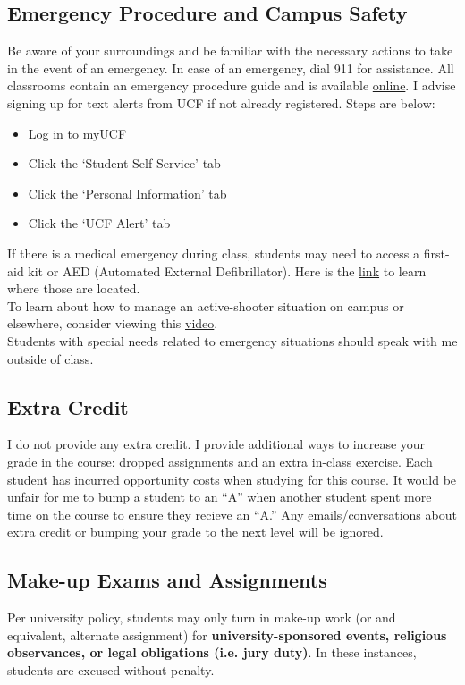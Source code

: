 \documentclass[11pt]{paper}
\begin{document}
\subsection{Emergency Procedure and Campus Safety}
Be aware of your surroundings and be familiar with the necessary actions to take in the event of an emergency. In case of an emergency, dial 911 for assistance. All classrooms contain an emergency procedure guide and is available \href{http://emergency.ucf.edu/emergency_guide.html}{online}. I advise signing up for text alerts from UCF if not already registered. Steps are below:
\begin{itemize}
	\item Log in to myUCF
	\item Click the `Student Self Service' tab
	\item Click the `Personal Information' tab
	\item Click the `UCF Alert' tab
\end{itemize} 

If there is a medical emergency during class, students may need to access a
first-aid kit or AED (Automated External Defibrillator). Here is the \href{http://www.ehs.ucf.edu/AEDlocations-UCF}{link} to learn where those are located.\\

To learn about how to manage an active-shooter situation on campus or elsewhere, consider viewing this \href{https://www.youtube.com/watch?v=NIKYajEx4pk&feature=youtu.be}{video}.\\

Students with special needs related to emergency situations should speak with me outside of class.
\subsection{Extra Credit}

I do not provide any extra credit. I provide additional ways to increase your grade in the course: dropped assignments and an extra in-class exercise. Each student has incurred opportunity costs when studying for this course. It would be unfair for me to bump a student to an ``A'' when another student spent more time on the course to ensure they recieve an ``A.'' Any emails/conversations about extra credit or bumping your grade to the next level will be ignored.

\subsection{Make-up Exams and Assignments}
Per university policy, students may only turn in make-up work (or and equivalent, alternate assignment) for \textbf{university-sponsored events, religious observances, or legal obligations (i.e. jury duty)}. In these instances, students are excused without penalty.\\
\end{document}
